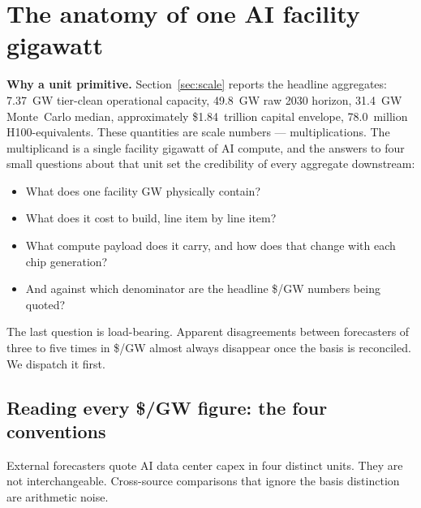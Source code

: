 %
%
\section{The anatomy of one AI facility gigawatt}
\label{sec:anatomy}

\textbf{Why a unit primitive.} Section~\ref{sec:scale} reports the headline aggregates: 7.37~GW tier-clean operational capacity, 49.8~GW raw 2030 horizon, 31.4~GW Monte~Carlo median, approximately \$1.84~trillion capital envelope, 78.0~million H100-equivalents. These quantities are scale numbers --- multiplications. The multiplicand is a single facility gigawatt of AI compute, and the answers to four small questions about that unit set the credibility of every aggregate downstream:

\begin{itemize}\itemsep2pt
\item What does one facility GW physically contain?
\item What does it cost to build, line item by line item?
\item What compute payload does it carry, and how does that change with each chip generation?
\item And against which denominator are the headline \$/GW numbers being quoted?
\end{itemize}

The last question is load-bearing. Apparent disagreements between forecasters of three to five times in \$/GW almost always disappear once the basis is reconciled. We dispatch it first.

\subsection{Reading every \$/GW figure: the four conventions}
\label{subsec:basis-conventions}

External forecasters quote AI data center capex in four distinct units. They are not interchangeable. Cross-source comparisons that ignore the basis distinction are arithmetic noise.

